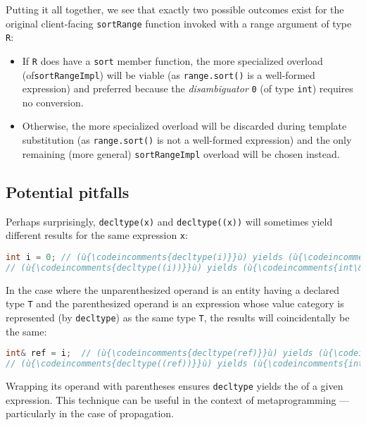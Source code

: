 Putting it all together, we see that exactly two possible
outcomes exist for the original client-facing \lstinline!sortRange! function
invoked with a range argument of type \lstinline!R!:

\begin{itemize}
\item{If \lstinline!R! does have a \lstinline!sort! member function, the more specialized overload (of\linebreak[4] \lstinline!sortRangeImpl!) will be viable (as \lstinline!range.sort()! is a well-formed expression) and preferred because the \emph{disambiguator} \lstinline!0! (of type \lstinline!int!) requires no conversion.}
\item{Otherwise, the more specialized overload will be discarded during template substitution (as \lstinline!range.sort()! is not a well-formed expression) and the only remaining (more general) \lstinline!sortRangeImpl! overload will be chosen instead.}
\end{itemize}

\subsection[Potential pitfalls]{Potential pitfalls}\label{potential-pitfalls}

Perhaps surprisingly, \lstinline!decltype(x)! and \lstinline!decltype((x))!
will sometimes yield different results for the same expression
\lstinline!x!:

\begin{lstlisting}[language=C++]
int i = 0; // (ù{\codeincomments{decltype(i)}}ù) yields (ù{\codeincomments{int}}ù).
// (ù{\codeincomments{decltype((i))}}ù) yields (ù{\codeincomments{int\&}}ù).
\end{lstlisting}

\noindent In the case where the unparenthesized operand is an entity having a
declared type \lstinline!T! and the parenthesized operand is an expression
whose value category is represented (by \lstinline!decltype!) as the same
type \lstinline!T!, the results will coincidentally be the same:

\begin{lstlisting}[language=C++]
int& ref = i;  // (ù{\codeincomments{decltype(ref)}}ù) yields (ù{\codeincomments{int\&}}ù).
// (ù{\codeincomments{decltype((ref))}}ù) yields (ù{\codeincomments{int\&}}ù).
\end{lstlisting}

\noindent Wrapping its operand with parentheses ensures \lstinline!decltype! yields
the  of a given expression. This technique can be
useful in the context of metaprogramming --- particularly in the case of
 propagation.

